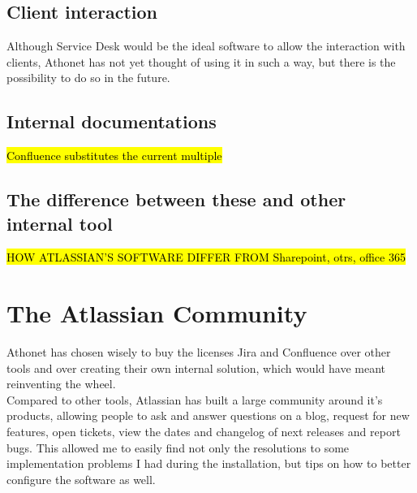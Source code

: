 	\subsection{Client interaction} 
		Although Service Desk would be the ideal software to allow the interaction with clients, Athonet has not yet thought of using it in such a way, but there is the possibility to do so in the future.
		
	\subsection{Internal documentations}
		\hl{Confluence substitutes the current multiple }
		
	\subsection{The difference between these and other internal tool}
		\hl{HOW ATLASSIAN'S SOFTWARE DIFFER FROM Sharepoint, otrs, office 365}

\section{The Atlassian Community}
	Athonet has chosen wisely to buy the licenses Jira and Confluence over other tools and over creating their own internal solution, which would have meant reinventing the wheel.\\
	Compared to other tools, Atlassian has built a large community around it's products, allowing people to ask and answer questions on a blog, request for new features, open tickets, view the dates and changelog of next releases and report bugs.
	This allowed me to easily find not only the resolutions to some implementation problems I had during the installation, but tips on how to better configure the software as well.


